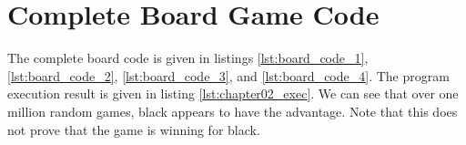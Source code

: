 \documentclass[12pt,a4paper,twoside,openright]{book}
\begin{document}
\section{Complete Board Game Code}


The complete board code is given in listings \ref{lst:board_code_1}, \ref{lst:board_code_2}, \ref{lst:board_code_3}, and \ref{lst:board_code_4}. The program execution result is given in listing \ref{lst:chapter02_exec}. We can see that over one million random games, black appears to have the advantage. Note that this does not prove that the game is winning for black.
\end{document}
